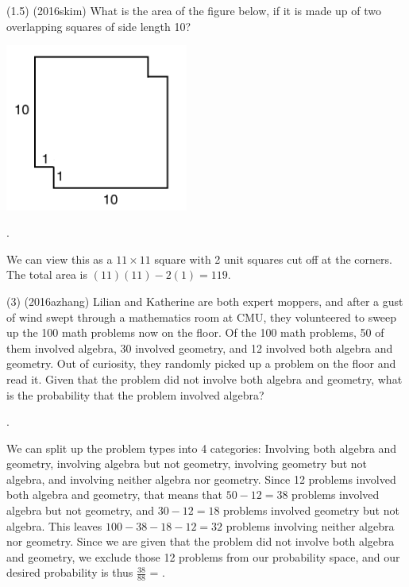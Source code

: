 \documentclass[11pt]{article}
\begin{document}
\begin{problem}
(1.5) (2016skim) What is the area of the figure below, if it is made up of two overlapping squares of side length 10?
\begin{center}
\includegraphics[width=6cm]{squares.png}
\end{center}
\end{problem}

\begin{answer}
.
\end{answer}

\begin{solution}
We can view this as a $11\times11$ square with 2 unit squares cut off at the corners. The total area is $(11)(11)-2(1) = \boxed{119}$.
\end{solution}

\begin{problem}
(3) (2016azhang) Lilian and Katherine are both expert moppers, and after a gust of wind swept through a mathematics room at CMU, they volunteered to sweep up the 100 math problems now on the floor. Of the 100 math problems, 50 of them involved algebra, 30 involved geometry, and 12 involved both algebra and geometry. Out of curiosity, they randomly picked up a problem on the floor and read it. Given that the problem did not involve both algebra and geometry, what is the probability that the problem involved algebra?
\end{problem}

\begin{answer}
.
\end{answer}

\begin{solution}
We can split up the problem types into 4 categories: Involving both algebra and geometry, involving algebra but not geometry, involving geometry but not algebra, and involving neither algebra nor geometry. Since 12 problems involved both algebra and geometry, that means that $50-12 = 38$ problems involved algebra but not geometry, and $30-12 = 18$ problems involved geometry but not algebra. This leaves $100 - 38 - 18 - 12 = 32$ problems involving neither algebra nor geometry. Since we are given that the problem did not involve both algebra and geometry, we exclude those 12 problems from our probability space, and our desired probability is thus $\frac{38}{88}$ = .
\end{solution}
\end{document}
